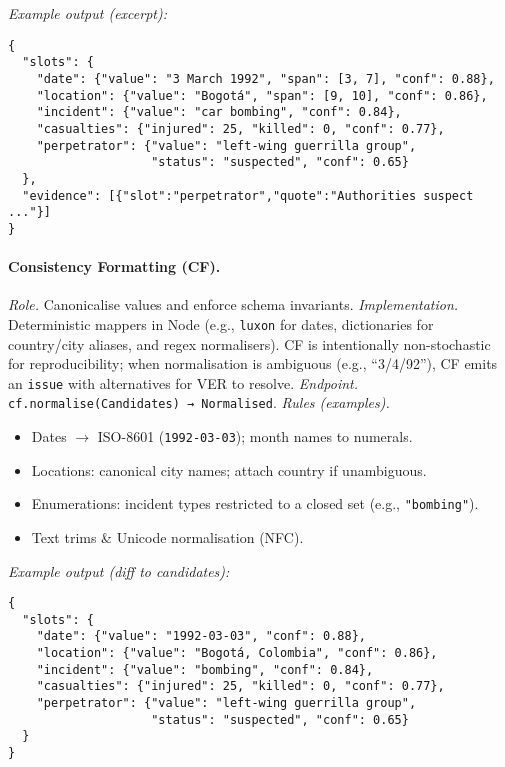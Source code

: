\medskip
\noindent\emph{Example output (excerpt):}
\begin{verbatim}
{
  "slots": {
    "date": {"value": "3 March 1992", "span": [3, 7], "conf": 0.88},
    "location": {"value": "Bogotá", "span": [9, 10], "conf": 0.86},
    "incident": {"value": "car bombing", "conf": 0.84},
    "casualties": {"injured": 25, "killed": 0, "conf": 0.77},
    "perpetrator": {"value": "left-wing guerrilla group",
                    "status": "suspected", "conf": 0.65}
  },
  "evidence": [{"slot":"perpetrator","quote":"Authorities suspect ..."}]
}
\end{verbatim}

\paragraph{Consistency Formatting (CF).}
\emph{Role.} Canonicalise values and enforce schema invariants.  
\emph{Implementation.} Deterministic mappers in Node (e.g., \texttt{luxon} for dates, dictionaries for country/city aliases, and regex normalisers). CF is intentionally non-stochastic for reproducibility; when normalisation is ambiguous (e.g., ``3/4/92''), CF emits an \texttt{issue} with alternatives for VER to resolve.  
\emph{Endpoint.} \texttt{cf.normalise(Candidates) → Normalised}.  
\emph{Rules (examples).}
\begin{itemize}
  \item Dates $\rightarrow$ ISO-8601 (\texttt{1992-03-03}); month names to numerals.
  \item Locations: canonical city names; attach country if unambiguous.
  \item Enumerations: incident types restricted to a closed set (e.g., \texttt{"bombing"}).
  \item Text trims \& Unicode normalisation (NFC).
\end{itemize}

\medskip
\noindent\emph{Example output (diff to candidates):}
\begin{verbatim}
{
  "slots": {
    "date": {"value": "1992-03-03", "conf": 0.88},
    "location": {"value": "Bogotá, Colombia", "conf": 0.86},
    "incident": {"value": "bombing", "conf": 0.84},
    "casualties": {"injured": 25, "killed": 0, "conf": 0.77},
    "perpetrator": {"value": "left-wing guerrilla group",
                    "status": "suspected", "conf": 0.65}
  }
}
\end{verbatim}

